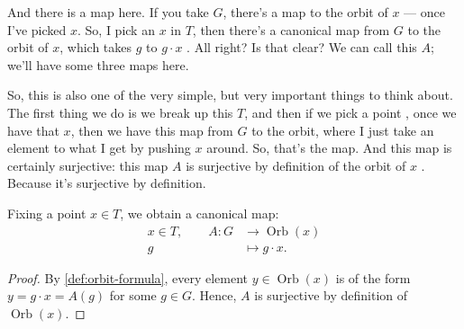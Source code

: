\begin{speech}[00:14:51 - 00:16:08]
And there is a map here. If you take $G$, there's a map to the orbit of $x$ --- once I've picked $x$. So, I pick an $x$ in $T$, then there's a canonical map from $G$ to the orbit of $x$, which takes $g$ to $g \cdot x$ . All right? Is that clear? We can call this $A$; we'll have some three maps here.

So, this is also one of the very simple, but very important things to think about. The first thing we do is we break up this $T$, and then if we pick a point , once we have that $x$, then we have this map from $G$ to the orbit, where I just take an element to what I get by pushing $x$ around. So, that's the map. And this map is certainly surjective: this map $A$ is surjective by definition of the orbit of $x$ . Because it's surjective by definition.
\end{speech}

\begin{content}
Fixing a point $x \in T$, we obtain a canonical map:
\[
\begin{aligned}
x \in T, \qquad A \colon G &\longrightarrow \operatorname{Orb}(x) \\
g &\longmapsto g \cdot x.
\end{aligned}
\]


\begin{proof}
By \cref{def:orbit-formula}, every element $y \in \operatorname{Orb}(x)$ is of the form $y = g \cdot x = A(g)$ for some $g \in G$. Hence, $A$ is surjective by definition of $\operatorname{Orb}(x)$.
\end{proof}
\end{content}

